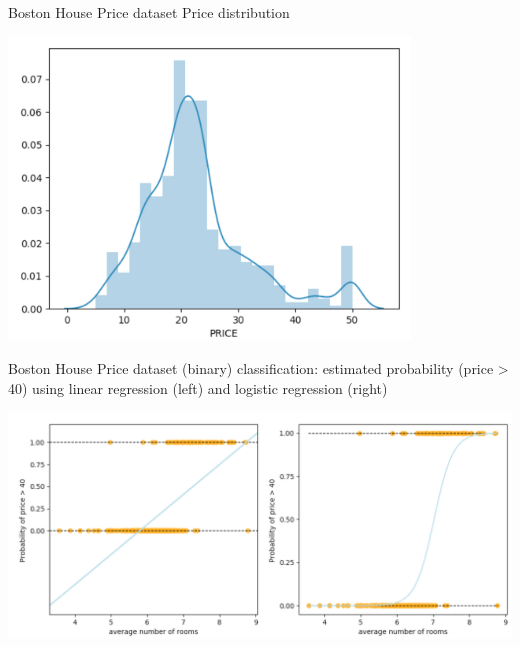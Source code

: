 \documentclass{beamer}
\begin{document}
\begin{frame}{Boston House Price dataset}
Price distribution\\
\begin{center}
\includegraphics[width=0.80\textwidth]{boston_distr}\\
\end{center}
\end{frame}

\begin{frame}{Boston House Price dataset}
(binary) classification: estimated probability (price > 40) using linear regression (left) and logistic regression (right)\\
\begin{center}
\includegraphics[width=1\textwidth]{log_linear_comparison}\\
\end{center}
\end{frame}
\end{document}
